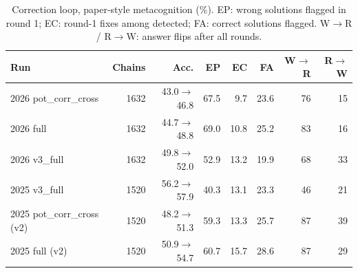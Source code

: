 \begin{table}[!t]
\centering
\scriptsize
\caption{Correction loop, paper-style metacognition (\%). EP: wrong solutions flagged in round 1; EC: round-1 fixes among detected; FA: correct solutions flagged. W$\to$R / R$\to$W: answer flips after all rounds.}
\label{tab:corr}
\setlength{\tabcolsep}{2.5pt}
\begin{tabular}{lrrrrrrr}
\toprule
Run & Chains & Acc. & EP & EC & FA & W$\to$R & R$\to$W \\
\midrule
2026 pot\_corr\_cross & 1632 & 43.0$\to$46.8 & 67.5 & 9.7 & 23.6 & 76 & 15 \\
2026 full & 1632 & 44.7$\to$48.8 & 69.0 & 10.8 & 25.2 & 83 & 16 \\
2026 v3\_full & 1632 & 49.8$\to$52.0 & 52.9 & 13.2 & 19.9 & 68 & 33 \\
2025 v3\_full & 1520 & 56.2$\to$57.9 & 40.3 & 13.1 & 23.3 & 46 & 21 \\
2025 pot\_corr\_cross (v2) & 1520 & 48.2$\to$51.3 & 59.3 & 13.3 & 25.7 & 87 & 39 \\
2025 full (v2) & 1520 & 50.9$\to$54.7 & 60.7 & 15.7 & 28.6 & 87 & 29 \\
\bottomrule
\end{tabular}
\end{table}
